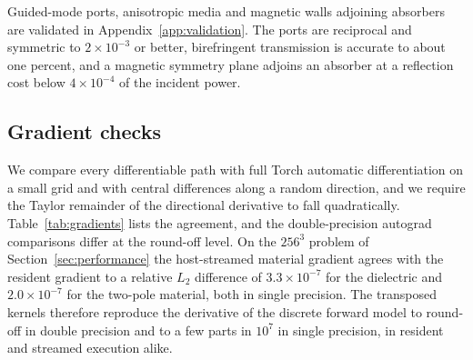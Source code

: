 \documentclass[11pt,a4paper]{article}
\begin{document}
Guided-mode ports, anisotropic media and magnetic walls adjoining absorbers are validated in Appendix~\ref{app:validation}. The ports are reciprocal and symmetric to $2\times10^{-3}$ or better, birefringent transmission is accurate to about one percent, and a magnetic symmetry plane adjoins an absorber at a reflection cost below $4\times10^{-4}$ of the incident power.

\subsection{Gradient checks}

We compare every differentiable path with full Torch automatic differentiation on a small grid and with central differences along a random direction, and we require the Taylor remainder of the directional derivative to fall quadratically. Table~\ref{tab:gradients} lists the agreement, and the double-precision autograd comparisons differ at the round-off level. On the $256^{3}$ problem of Section~\ref{sec:performance} the host-streamed material gradient agrees with the resident gradient to a relative $L_2$ difference of $3.3\times10^{-7}$ for the dielectric and $2.0\times10^{-7}$ for the two-pole material, both in single precision. The transposed kernels therefore reproduce the derivative of the discrete forward model to round-off in double precision and to a few parts in $10^{7}$ in single precision, in resident and streamed execution alike.
\end{document}
